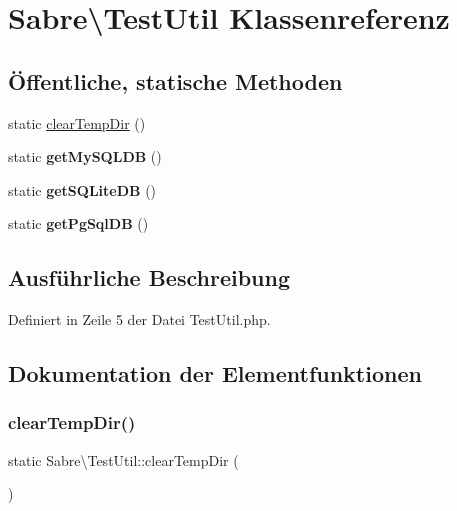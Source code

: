 \hypertarget{class_sabre_1_1_test_util}{}\section{Sabre\textbackslash{}Test\+Util Klassenreferenz}
\label{class_sabre_1_1_test_util}
\subsection*{Öffentliche, statische Methoden}
\begin{DoxyCompactItemize}
\item 
static \mbox{\hyperlink{class_sabre_1_1_test_util_a37b93ec0ddecf48cdd84a59278006439}{clear\+Temp\+Dir}} ()
\item 
\mbox{\label{class_sabre_1_1_test_util_ad0303e56dc4edf1337ad6e3f22095621}} 
static {\bfseries get\+My\+S\+Q\+L\+DB} ()
\item 
\mbox{\label{class_sabre_1_1_test_util_a545cf73a9ab4ad514a9e647f7d85b29e}} 
static {\bfseries get\+S\+Q\+Lite\+DB} ()
\item 
\mbox{\label{class_sabre_1_1_test_util_a578e10e0dee4d090433155b4bf560598}} 
static {\bfseries get\+Pg\+Sql\+DB} ()
\end{DoxyCompactItemize}


\subsection{Ausführliche Beschreibung}


Definiert in Zeile 5 der Datei Test\+Util.\+php.



\subsection{Dokumentation der Elementfunktionen}
\mbox{\label{class_sabre_1_1_test_util_a37b93ec0ddecf48cdd84a59278006439}} 
\subsubsection{\texorpdfstring{clear\+Temp\+Dir()}{clearTempDir()}}
{\footnotesize\ttfamily static Sabre\textbackslash{}\+Test\+Util\+::clear\+Temp\+Dir (\begin{DoxyParamCaption}{ }\end{DoxyParamCaption})\hspace{0.3cm}{\ttfamily [static]}}

